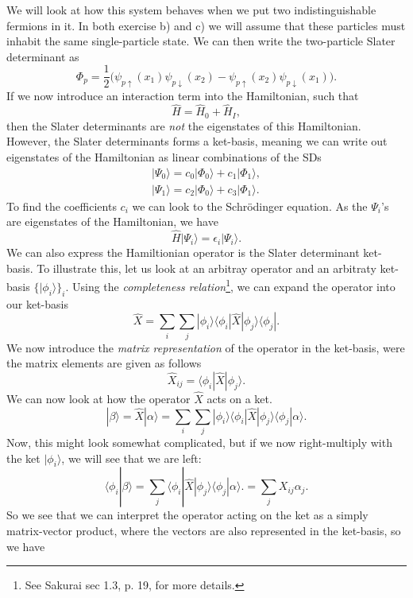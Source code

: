 \documentclass[a4paper, 11pt, notitlepage, english]{article}
\newcommand{\bra}[1]{\langle #1|}
\newcommand{\ket}[1]{|#1 \rangle}
\newcommand{\braket}[2]{\langle #1 | #2 \rangle}
\newcommand{\op}[1]{\hat{#1}}
\newcommand{\braopket}[3]{\langle #1 | {#2} | #3 \rangle}
\newcommand{\eps}{\epsilon}
\begin{document}
We will look at how this system behaves when we put two indistinguishable fermions in it. In both exercise b) and c) we will assume that these particles must inhabit the same single-particle state. We can then write the two-particle Slater determinant as
$$\Phi_p = \frac{1}{2}\bigg(\psi_{p\uparrow}(x_1)\psi_{p\downarrow}(x_2) - \psi_{p\uparrow}(x_2)\psi_{p\downarrow}(x_1)\bigg).$$ 
If we now introduce an interaction term into the Hamiltonian, such that
$$\op{H} = \op{H}_0 + \op{H}_I,$$
then the Slater determinants are \emph{not} the eigenstates of this Hamiltonian. However, the Slater determinants forms a ket-basis, meaning we can write out eigenstates of the Hamiltonian as linear combinations of the SDs
\begin{align*}
\ket{\Psi_0} = c_{0}\ket{\Phi_0} + c_{1}\ket{\Phi_1}, \\
\ket{\Psi_1} = c_{2}\ket{\Phi_0} + c_{3}\ket{\Phi_1}.
\end{align*}
To find the coefficients $c_{i}$ we can look to the Schrödinger equation. As the $\Psi_i$'s are eigenstates of the Hamiltonian, we have
$$\op{H}\ket{\Psi_i} = \eps_i\ket{\Psi_i}.$$ 
We can also express the Hamiltionian operator is the Slater determinant ket-basis. To illustrate this, let us look at an arbitray operator and an arbitraty ket-basis $\{\ket{\phi_i}\}_i$. Using the \emph{completeness relation}\footnote{See Sakurai sec 1.3, p. 19, for more details.}, we can expand the operator into our ket-basis
$$\op{X} = \sum_i \sum_j \ket{\phi_i}\braopket{\phi_i}{\op{X}}{\phi_j}\bra{\phi_j}.$$
We now introduce the \emph{matrix representation} of the operator in the ket-basis, were the matrix elements are given as follows
$$\op{X}_{ij} = \braopket{\phi_i}{\op{X}}{\phi_j}.$$
We can now look at how the operator $\op{X}$ acts on a ket.
$$\ket{\beta} = \op{X} \ket{\alpha} = \sum_i \sum_j \ket{\phi_i}\braopket{\phi_i}{\op{X}}{\phi_j}\braket{\phi_j}{\alpha}.$$
Now, this might look somewhat complicated, but if we now right-multiply with the ket $\ket{\phi_i}$, we will see that we are left:
$$\braket{\phi_i}{\beta} = \sum_j \braopket{\phi_i}{\op{X}}{\phi_j}\braket{\phi_j}{\alpha}. = \sum_j X_{ij} \alpha_j.$$
So we see that we can interpret the operator acting on the ket as a simply matrix-vector product, where the vectors are also represented in the ket-basis, so we have
\end{document}
